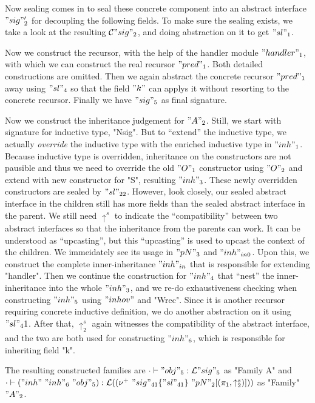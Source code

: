 Now sealing comes in to seal these concrete component into an abstract interface $"sig"_2'$ for decoupling the following fields. To make sure the sealing exists, we take a look at the resulting ${\mathcal{C}} "sig"_2$, and doing abstraction on it to get $"sl"_1$. 

Now we construct the recursor, with the help of the handler module $"handler"_1$, with which we can construct the real recursor $"pred"_1$. Both detailed constructions are omitted. Then we again abstract the concrete recursor $"pred"_1$ away using $"sl"_4$ so that the field $"k"$ can applys it without resorting to the concrete recursor. Finally we have $"sig"_5$ as final signature. 

Now we construct the inheritance judgement for $"A"_2$. Still, we start with signature for inductive type, "Nsig". But to ``extend'' the inductive type, we actually \textit{override} the inductive type with the enriched inductive type in $"inh"_1$. Because inductive type is overridden, inheritance on the constructors are not pausible and thus we need to override the old $"O"_1$ constructor using $"O"_2$ and extend with new constructor for "S", resulting $"inh"_3$. These newly overridden constructors are sealed by $"sl"_{22}$. However, look closely, our sealed abstract interface in the children still has more fields than the sealed abstract interface in the parent. We still need $\uparrow^s$ to indicate the ``compatibility'' between two abstract interfaces so that the inheritance from the parents can work. It can be understood as ``upcasting'', but this ``upcasting'' is used to upcast the context of the children. We immeidately see its usage in $"pN"_3$ and $"inh"_{in0}$. Upon this, we construct the complete inner-inheritance $"inh"_{in}$ that is responsible for extending "handler". Then we continue the construction for $"inh"_4$ that ``nest'' the inner-inheritance into the whole $"inh"_3$, and we re-do exhaustiveness checking when constructing $"inh"_5$ using $"inhov"$ and "Wrec". Since it is another recursor requiring concrete inductive definition, we do another abstraction on it using $"sl"_41$. After that, $\uparrow^s_2$ again witnesses the compatibility of the abstract interface, and the two are both used for constructing $"inh"_6$, which is responsible for inheriting field "k". 

The resulting constructed families are ${ {\cdot} \vdash {"obj"_5} : {{\mathcal{L}}"sig"_5} }$ as "Family A" and \\ ${ {\cdot} \vdash {("inh"~"inh"_6~"obj"_5)} : {{\mathcal{L}}((\nu^+ \ "sig"_{41} \{"sl"_{41}\} \ "pN"_2[(\pi_1, \uparrow^s_2)]))} }$ as "Family" $"A"_2$.

